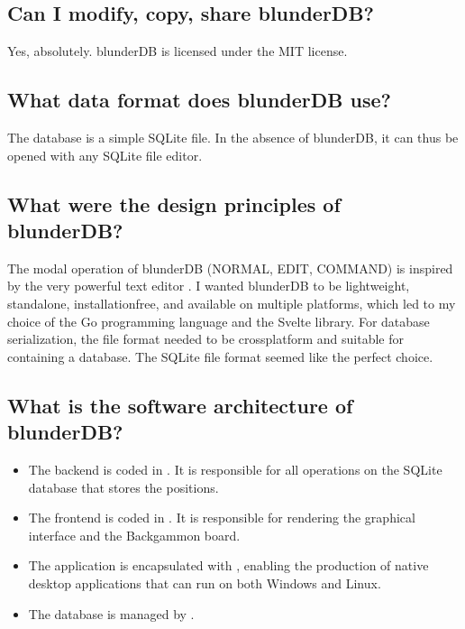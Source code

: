 \documentclass[letterpaper,10pt,english]{sphinxmanual}
\begin{document}
\subsection{Can I modify, copy, share blunderDB?}
\label{\detokenize{faq:puis-je-modifier-copier-partager-blunderdb}}
\sphinxAtStartPar
Yes, absolutely. blunderDB is licensed under the MIT license.


\subsection{What data format does blunderDB use?}
\label{\detokenize{faq:quel-format-de-donnees-utilise-blunderdb}}
\sphinxAtStartPar
The database is a simple SQLite file. In the absence of blunderDB, it can thus be opened with any SQLite file editor.


\subsection{What were the design principles of blunderDB?}
\label{\detokenize{faq:quelles-ont-ete-les-principes-de-conception-de-blunderdb}}
\sphinxAtStartPar
The modal operation of blunderDB (NORMAL, EDIT, COMMAND) is inspired by the very powerful text editor . I wanted blunderDB to be lightweight, standalone, installation\sphinxhyphen{}free, and available on multiple platforms, which led to my choice of the Go programming language and the Svelte library. For database serialization, the file format needed to be cross\sphinxhyphen{}platform and suitable for containing a database. The SQLite file format seemed like the perfect choice.


\subsection{What is the software architecture of blunderDB?}
\label{\detokenize{faq:quel-est-l-architecture-logicielle-de-blunderdb}}\begin{itemize}
\item {} 
\sphinxAtStartPar
The backend is coded in . It is responsible for all operations on the SQLite database that stores the positions.

\item {} 
\sphinxAtStartPar
The frontend is coded in . It is responsible for rendering the graphical interface and the Backgammon board.

\item {} 
\sphinxAtStartPar
The application is encapsulated with , enabling the production of native desktop applications that can run on both Windows and Linux.

\item {} 
\sphinxAtStartPar
The database is managed by .

\end{itemize}
\end{document}
